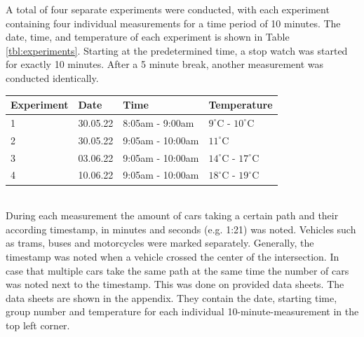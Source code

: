 A total of four separate experiments were conducted, with each experiment containing four individual measurements for a time period of 10 minutes. The date, time, and temperature of each experiment is shown in Table \ref{tbl:experiments}. Starting at the predetermined time, a stop watch was started for exactly 10 minutes. After a 5 minute break, another measurement was conducted identically.
\begin{center}
\begin{tabular}{ |p{4.5em}|p{3.5em}|p{7.5em}|p{5.5em}|}
 \hline
 Experiment & Date & Time & Temperature  \\
 \hline
 1 & 30.05.22 & 8:05am - 9:00am & $9^\circ$C - $10^\circ$C \\
 \hline
 2 & 30.05.22 & 9:05am - 10:00am & $11^\circ$C \\
 \hline
  3 & 03.06.22 & 9:05am - 10:00am & $14^\circ$C - $17^\circ$C\\
 \hline
  4 & 10.06.22 & 9:05am - 10:00am & $18^\circ$C - $19^\circ$C \\
 \hline
\end{tabular}
\label{tbl:experiments}
\end{center}
~\\
During each measurement the amount of cars taking a certain path and their according timestamp, in minutes and seconds (e.g. 1:21) was noted. Vehicles such as trams, buses and motorcycles were marked separately. Generally, the timestamp was noted when a vehicle crossed the center of the intersection. 
In case that multiple cars take the same path at the same time the number of cars was noted next to the timestamp. This was done on provided data sheets. The data sheets are shown in the appendix. They contain the date, starting time, group number and temperature for each individual 10-minute-measurement in the top left corner.


